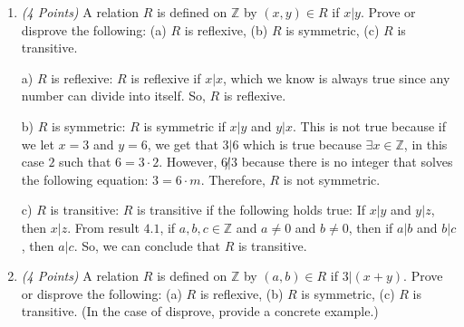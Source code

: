 \documentclass[10pt]{article} %
\newcommand{\N}{\mathbb{N}}
\newcommand{\Z}{\mathbb{Z}}
\newcommand{\points}[1]{{\it (#1 Points)}}
\begin{document}
\begin{enumerate}
\bigskip


The above statement can be rewritten as: $$a_n=a_{n-1}+a_{n-2}, n \geq 3$$
\begin{proof} $\forall n \in \N, a_n<2^n$
{\bf Step 1:} 

$n=1, a_1=1<2^1$ and 

$n=2, a_2=2<2^2=4$ so it holds for the base step.  

{\bf Step 2:} Suppose $a_n<2^n$ is true for $n=k$ then for $n=k+1$:
$$a_{k+1}=a_{(k+1)-1}+a_{(k+1)-2}=a_k+a_{k-1}<2^k+2^{k-1}$$
$$=2 \cdot 2^{k-1}+2^{k-1}=2^{k-1} \cdot (2+1)=3 \cdot 2^{k-1}<2^k+2^{k-1}<2^k+2 \cdot 2^{k-1}=2^k+2^k=2 \cdot 2^k=2^{k+1}$$

{\bf Step 3:} From strong PMI, we have proven that if $a_1=1$, $a_2=2$,
and $a_{n+1}=a_n+a_{n-1}$ for $n\ge 2$, then $a_n<2^n$ for $n\in \N$.  

\end{proof}

    \item \points{4}  A relation $R$ is defined on $\Z$ by $(x,y)\in R$ if $x | y$. Prove or disprove the following:  (a) $R$ is reflexive,  (b) $R$ is symmetric,  (c) $R$ is transitive.
    
    \bigskip
    
    
    a) $R$ is reflexive: $R$ is reflexive if $x|x$, which we know is always true since any number can divide into itself.  So, $R$ is reflexive.  
    
    b) $R$ is symmetric: $R$ is symmetric if $x|y$ and $y|x$.  This is not true because if we let $x=3$ and $y=6$, we get that $3|6$ which is true because $\exists x \in \Z$, in this case $2$ such that $6=3 \cdot 2$.  However, $6\not| 3$ because there is no integer that solves the following equation: $3=6 \cdot m$.  Therefore, $R$ is not symmetric.  
    
    c) $R$ is transitive: $R$ is transitive if the following holds true: If $x|y$ and $y|z$, then $x|z$.  From result $4.1$, if $a,b,c \in \Z$ and $a\neq 0$ and $b\neq0$, then if $a|b$ and $b|c$, then $a|c$.  So, we can conclude that $R$ is transitive.  

\item \points{4} A relation $R$ is defined on $\Z$ by $(a, b) \in R$  if $3|(x+y)$. Prove or disprove the following:  (a) $R$ is reflexive,  (b) $R$ is symmetric,  (c) $R$ is transitive. (In the case of disprove, provide a concrete example.)


\end{enumerate}
\end{document}
